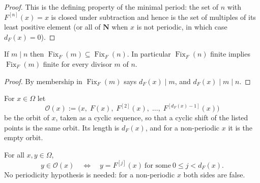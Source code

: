 \begin{proof}
  \leanok
  This is the defining property of the minimal period: the set of $n$ with
  $F^{[n]}(x)=x$ is closed under subtraction and hence is the set of multiples
  of its least positive element (or all of $\mathbf N$ when $x$ is not
  periodic, in which case $d_F(x)=0$).
\end{proof}

\begin{lemma}
  \label{lemma:weil-frobenius-fixed-point-set-monotone}
  \leanok

  If $m\mid n$ then $\operatorname{Fix}_F(m)\subseteq\operatorname{Fix}_F(n)$.
  In particular $\operatorname{Fix}_F(n)$ finite implies
  $\operatorname{Fix}_F(m)$ finite for every divisor $m$ of $n$.
\end{lemma}

\begin{proof}
  \leanok
  By  membership in
  $\operatorname{Fix}_F(m)$ says $d_F(x)\mid m$, and $d_F(x)\mid m\mid n$.
\end{proof}

\begin{definition}
  \label{def:weil-frobenius-orbit}
  \leanok

  For $x\in\Omega$ let
  \[
    \mathcal O(x):=
      \bigl(x,\;F(x),\;F^{[2]}(x),\;\dots,\;F^{[d_F(x)-1]}(x)\bigr)
  \]
  be the orbit of $x$, taken as a cyclic sequence, so that a cyclic shift of
  the listed points is the same orbit.  Its length is $d_F(x)$, and for a
  non-periodic $x$ it is the empty orbit.
\end{definition}

\begin{lemma}
  \label{lemma:weil-frobenius-orbit-members}
  \leanok

  For all $x,y\in\Omega$,
  \[
    y\in\mathcal O(x)
    \quad\Longleftrightarrow\quad
    y=F^{[j]}(x)\ \text{for some}\ 0\le j<d_F(x).
  \]
  No periodicity hypothesis is needed: for a non-periodic $x$ both sides are
  false.
\end{lemma}

